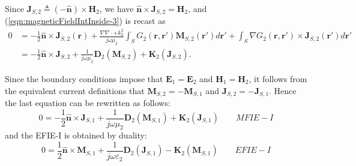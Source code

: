 \documentclass[a4paper,10pt]{book}
\newcommand{\field}[1]{\mathbf{#1}}
\newcommand{\current}[1]{\mathbf{#1}}
\newcommand{\vect}[1]{\mathbf{#1}}
\newcommand{\operator}[1]{\mathbf{#1}}
\begin{document}
Since $\current{J}_{S,2} \triangleq (-\vect{\hat{n}}) \times \field{H}_2$, we have $\vect{\hat{n}} \times \current{J}_{S,2} = \field{H}_2$, and (\ref{eqn:magneticFieldIntInside-3}) is recast as
\begin{equation}\label{eqn:magneticFieldIntInside-4}
\begin{split}
0 &= - \frac{1}{2} \vect{\hat{n}} \times \current{J}_{S,2}\left(\vect{r}\right) + \frac{\nabla \nabla \cdot + k_2^2}{j \omega \mu_2} \int_S G_2(\vect{r}, \vect{r}') \current{M}_{S,2}\left(\vect{r}'\right) d\vect{r}' +  \int_S \nabla G_2(\vect{r}, \vect{r}') \times \current{J}_{S,2}\left(\vect{r}'\right) d\vect{r}' \\
&=  - \frac{1}{2} \vect{\hat{n}} \times \current{J}_{S,2} + \frac{1}{j \omega \mu_2} \operator{D}_2\left(\current{M}_{S,2}\right) +  \operator{K}_2\left( \current{J}_{S,2}\right).
\end{split}
\end{equation}

%
\par
Since the boundary conditions impose that $\field{E}_1 = \field{E}_2$ and $\field{H}_1 = \field{H}_2$, it follows from the equivalent current definitions that $\current{M}_{S,2} = -\current{M}_{S,1}$ and $\current{J}_{S,2} = -\current{J}_{S,1}$. Hence the last equation can be rewritten as follows:
\begin{equation}\label{eqn:MFIE-I}
\boxed{
0 = - \frac{1}{2} \vect{\hat{n}} \times \current{J}_{S,1} + \frac{1}{j \omega \mu_2} \operator{D}_2\left(\current{M}_{S,1}\right) +  \operator{K}_2\left( \current{J}_{S,1}\right)
} \qquad MFIE-I
\end{equation}
and the EFIE-I is obtained by duality:
\begin{equation}\label{eqn:EFIE-I}
\boxed{
0 = \frac{1}{2} \vect{\hat{n}} \times \current{M}_{S,1} + \frac{1}{j \omega \varepsilon_2} \operator{D}_2\left(\current{J}_{S,1}\right) -  \operator{K}_2\left( \current{M}_{S,1}\right)
} \qquad EFIE-I
\end{equation}
\end{document}
